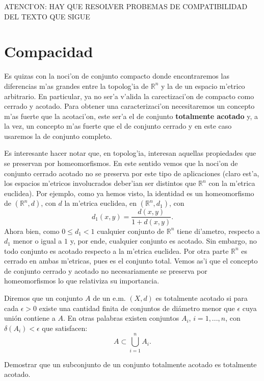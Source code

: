 ATENCI'ON: HAY QUE RESOLVER PROBEMAS DE COMPATIBILIDAD DEL TEXTO QUE SIGUE





\section{Compacidad}

Es quizas con la noci'on de conjunto compacto donde encontraremos
las diferencias m'as grandes entre la topolog'ia de $\mathbb{R}^n$
y la de un espacio m'etrico arbitrario. En particular, ya no ser'a
v'alida la carectizaci'on de compacto como cerrado y acotado. Para
obtener una caracterizaci'on necesitaremos un concepto m'as fuerte
que la acotaci'on, este ser'a el de conjunto \textbf{totalmente
acotado} y, a la vez, un concepto m'as fuerte que el de conjunto
cerrado y en este caso usaremos la de conjunto completo.

Es interesante hacer notar que, en topolog'ia, interesan aquellas
propiedades que se preservan por homeomorfismos. En este sentido
vemos que la noci'on de conjunto cerrado acotado no se preserva
por este tipo de aplicaciones (claro est'a, los espacios m'etricos
involucrados deber'ian ser distintos que $\mathbb{R}^n$ con la
m'etrica euclidea). Por ejemplo, como ya hemos visto, la identidad
es un homeomorfismo de $(\mathbb{R}^n,d)$, con $d$ la m'etrica
euclidea, en $(\mathbb{R}^n,d_1)$, con
\[
	d_1(x,y)=\frac{d(x,y)}{1+d(x,y)}.
\]
Ahora bien, como $0\leq d_1<1$ cualquier conjunto de
$\mathbb{R}^n$ tiene di'ametro, respecto a $d_1$ menor o igual a
$1$ y, por ende, cualquier conjunto es acotado. Sin embargo, no
todo conjunto es acotado respecto a la m'etrica euclidea. Por otra
parte $\mathbb{R}^n$ es cerrado en ambas m'etricas, pues es el
conjunto total. Vemos as'i que el concepto de conjunto cerrado y
acotado no necesariamente se preserva por homeomorfismos lo que
relativiza su importancia.



\begin{definicion}  Diremos que un conjunto $A$ de un e.m. $(X,d)$
es totalmente acotado
si para cada $\epsilon>0$ existe una cantidad finita de conjuntos
de di\'ametro menor que $\epsilon$ cuya uni\'on contiene a  $A$.
En otras palabras existen conjuntos $A_i$, $i=1,...,n$, con
$\delta(A_i)<\epsilon$ que satisfacen:
\[
	A\subset \bigcup\limits_{i=1}^nA_i.
\]
\end{definicion}


\begin{ejercicio}\label{ejer,subpreespre} Demostrar que un
subconjunto de un conjunto totalmente acotado es totalmente
acotado.
\end{ejercicio}


